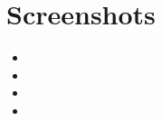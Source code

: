 \documentclass[../documentacion_buscaminas2013.tex]{subfiles}
\begin{document}
\section{Screenshots}
\begin{itemize}
 \item 
 \item 
 \item 
 \item 
\end{itemize} 
\clearpage
\end{document}
